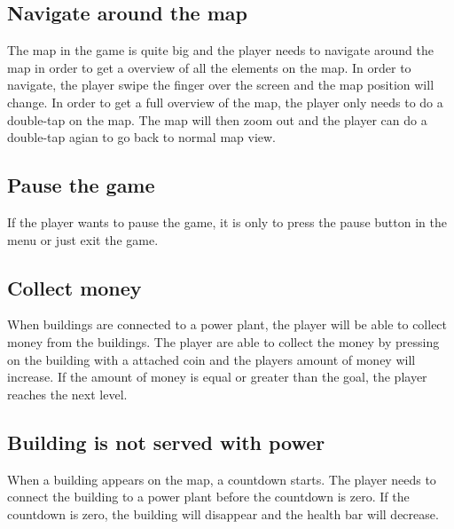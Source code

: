 \subsection*{Navigate around the map}
	
	The map in the game is quite big and the player needs to navigate around
	the map in order to get a overview of all the elements on the map. 
	In order to navigate, the player swipe the finger over the screen and the 
	map position will change. In order to get a full overview of the map, the player
	only needs to do a double-tap on the map. The map will then zoom out and the player
	can do a double-tap agian to go back to normal map view. 

\subsection*{Pause the game}

	If the player wants to pause the game, it is only to press the pause button in 
	the menu or just exit the game. 

\subsection*{Collect money}
	
	When buildings are connected to a power plant, the player will be able to collect
	money from the buildings. The player are able to collect the money by pressing on the
	building with a attached coin and the players amount of money will increase. If
	the amount of money is equal or greater than the goal, the player reaches the next level.

\subsection*{Building is not served with power}

	When a building appears on the map, a countdown starts. The player needs to connect
	the building to a power plant before the countdown is zero. If the countdown is zero, 
	the building will disappear and the health bar will decrease.  